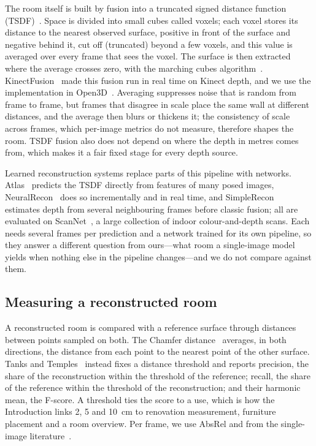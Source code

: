 The room itself is built by fusion into a truncated signed distance function (TSDF)~\cite{curless96}. Space is divided
into small cubes called voxels; each voxel stores its distance to the nearest observed surface, positive in front of
the surface and negative behind it, cut off (truncated) beyond a few voxels, and this value is averaged over every frame
that sees the voxel. The surface is then extracted where the average crosses zero, with the marching cubes
algorithm~\cite{marchingcubes}. KinectFusion~\cite{kinectfusion} made this fusion run in real time on Kinect depth,
and we use the implementation in Open3D~\cite{open3d}. Averaging suppresses noise that is random from frame to frame,
but frames that disagree in scale place the same wall at different distances, and the average then blurs or thickens
it; the consistency of scale across frames, which per-image metrics do not measure, therefore shapes the room. TSDF
fusion also does not depend on where the depth in metres comes from, which makes it a fair fixed stage for every depth
source.

Learned reconstruction systems replace parts of this pipeline with networks. Atlas~\cite{atlas} predicts the TSDF
directly from features of many posed images, NeuralRecon~\cite{neuralrecon} does so incrementally and in real time,
and SimpleRecon~\cite{simplerecon} estimates depth from several neighbouring frames before classic fusion; all are
evaluated on ScanNet~\cite{scannet}, a large collection of indoor colour-and-depth scans. Each needs several frames per
prediction and a network trained for its own pipeline, so they answer a different question from ours---what room a
single-image model yields when nothing else in the pipeline changes---and we do not compare against them.

\subsection{Measuring a reconstructed room}
A reconstructed room is compared with a reference surface through distances between points sampled on both. The
Chamfer distance~\cite{chamfer} averages, in both directions, the distance from each point to the nearest point of the
other surface. Tanks and Temples~\cite{tanks} instead fixes a distance threshold and reports precision, the share of
the reconstruction within the threshold of the reference; recall, the share of the reference within the threshold of
the reconstruction; and their harmonic mean, the F-score. A threshold ties the score to a use, which is how the
Introduction links 2, 5 and \SI{10}{cm} to renovation measurement, furniture placement and a room overview. Per frame,
we use AbsRel and \wone{} from the single-image literature~\cite{eigen14}.

